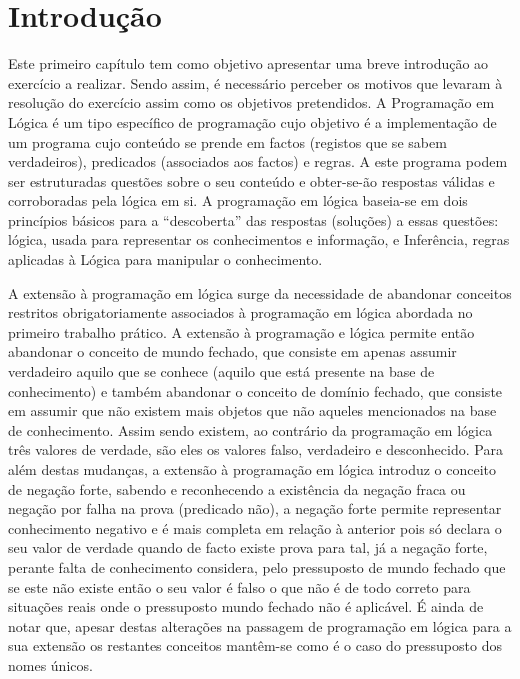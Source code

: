 \chapter{Introdução}
\label{cap:p1}
Este primeiro capítulo tem como objetivo apresentar uma breve introdução ao exercício a realizar. Sendo assim, é necessário perceber os motivos que levaram à resolução do exercício assim como os objetivos pretendidos.
A Programação em Lógica é um tipo específico de programação cujo objetivo é a implementação de um programa cujo conteúdo se prende em factos (registos que se sabem verdadeiros), predicados (associados aos factos) e regras. A este programa podem ser estruturadas questões sobre o seu conteúdo e obter-se-ão respostas válidas e corroboradas pela lógica em si.
A programação em lógica baseia-se em dois princípios básicos para a “descoberta” das respostas (soluções) a essas questões: lógica, usada para representar os conhecimentos e informação, e Inferência, regras aplicadas à Lógica para manipular o conhecimento.

A extensão à programação em lógica surge da necessidade de abandonar conceitos restritos obrigatoriamente associados à programação em lógica abordada no primeiro trabalho prático.
A extensão à programação e lógica permite então abandonar o conceito de mundo fechado, que consiste em apenas assumir verdadeiro aquilo que se conhece (aquilo que está presente na base de conhecimento) e também abandonar o conceito de domínio fechado, que consiste em assumir que não existem mais objetos que não aqueles mencionados na base de conhecimento. Assim sendo existem, ao contrário da programação em lógica três valores de verdade, são eles os valores falso, verdadeiro e desconhecido.
Para além destas mudanças, a extensão à programação em lógica introduz o conceito de negação forte, sabendo e reconhecendo a existência da negação fraca ou negação por falha na prova (predicado não), a negação forte permite representar conhecimento negativo e é mais completa em relação à anterior pois só declara o seu valor de verdade quando de facto existe prova para tal, já a negação forte, perante falta de conhecimento considera, pelo pressuposto de mundo fechado que se este não existe então o seu valor é falso o que não é de todo correto para situações reais onde o pressuposto mundo fechado não é aplicável.
É ainda de notar que, apesar destas alterações na passagem de programação em lógica para a sua extensão os restantes conceitos mantêm-se como é o caso do pressuposto dos nomes únicos.





